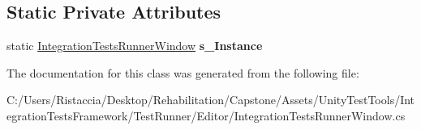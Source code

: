 \subsection*{Static Private Attributes}
\begin{DoxyCompactItemize}
\item 
\mbox{\label{class_unity_test_1_1_integration_tests_runner_window_a7322d0a37e024f8a47675a8905faf632}} 
static \hyperlink{class_unity_test_1_1_integration_tests_runner_window}{Integration\+Tests\+Runner\+Window} {\bfseries s\+\_\+\+Instance}
\end{DoxyCompactItemize}


The documentation for this class was generated from the following file\+:\begin{DoxyCompactItemize}
\item 
C\+:/\+Users/\+Ristaccia/\+Desktop/\+Rehabilitation/\+Capstone/\+Assets/\+Unity\+Test\+Tools/\+Integration\+Tests\+Framework/\+Test\+Runner/\+Editor/Integration\+Tests\+Runner\+Window.\+cs\end{DoxyCompactItemize}
